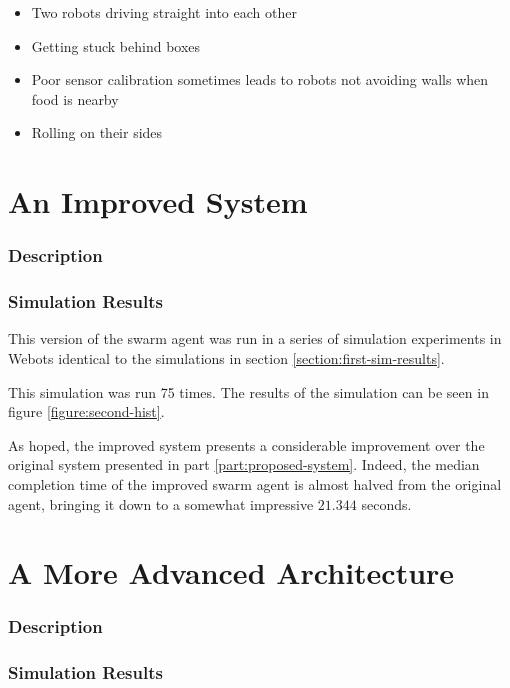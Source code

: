 \documentclass[a4paper]{article}
\begin{document}
\begin{itemize}
	\item Two robots driving straight into each other
	\item Getting stuck behind boxes
	\item Poor sensor calibration sometimes leads to robots not avoiding walls when food is nearby
	\item Rolling on their sides
\end{itemize}

\part{An Improved System}

\section{Description}

\section{Simulation Results}

This version of the swarm agent was run in a series of simulation experiments in Webots identical to the simulations in section \vref{section:first-sim-results}.

This simulation was run 75 times.
The results of the simulation can be seen in figure \vref{figure:second-hist}.

As hoped, the improved system presents a considerable improvement over the original system presented in part \vref{part:proposed-system}.
Indeed, the median completion time of the improved swarm agent is almost halved from the original agent, bringing it down to a somewhat impressive $ 21.344 $ seconds.

\part{A More Advanced Architecture}
\label{part:advanced-system}

\section{Description}

\section{Simulation Results}
\end{document}
